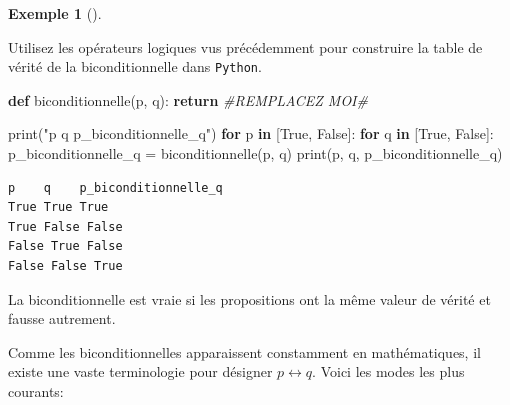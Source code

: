 \documentclass[
  letterpaper,
]{scrbook}
\newenvironment{Shaded}{}{}
\newcommand{\BuiltInTok}[1]{#1}
\newcommand{\CommentTok}[1]{\textcolor[rgb]{0.38,0.63,0.69}{\textit{#1}}}
\newcommand{\ControlFlowTok}[1]{\textcolor[rgb]{0.00,0.44,0.13}{\textbf{#1}}}
\newcommand{\KeywordTok}[1]{\textcolor[rgb]{0.00,0.44,0.13}{\textbf{#1}}}
\newcommand{\NormalTok}[1]{#1}
\newcommand{\OperatorTok}[1]{\textcolor[rgb]{0.40,0.40,0.40}{#1}}
\newcommand{\StringTok}[1]{\textcolor[rgb]{0.25,0.44,0.63}{#1}}
\newcommand{\VariableTok}[1]{\textcolor[rgb]{0.10,0.09,0.49}{#1}}
\theoremstyle{plain}
\theoremstyle{definition}
\newtheorem{example}{Exemple}[chapter]
\theoremstyle{definition}
\theoremstyle{remark}
\begin{document}
\leavevmode{}%
\begin{example}[]\label{exm-biconditionnelle-python}

Utilisez les opérateurs logiques vus précédemment pour construire la
table de vérité de la biconditionnelle dans \texttt{Python}.

\hypertarget{biconditionnelle-python-todo}{}
\begin{Shaded}
\begin{Highlighting}[]
\KeywordTok{def}\NormalTok{ biconditionnelle(p, q):}
    \ControlFlowTok{return} \CommentTok{\#REMPLACEZ MOI\#}

\BuiltInTok{print}\NormalTok{(}\StringTok{"p    q    p\_biconditionnelle\_q"}\NormalTok{)}
\ControlFlowTok{for}\NormalTok{ p }\KeywordTok{in}\NormalTok{ [}\VariableTok{True}\NormalTok{, }\VariableTok{False}\NormalTok{]:}
    \ControlFlowTok{for}\NormalTok{ q }\KeywordTok{in}\NormalTok{ [}\VariableTok{True}\NormalTok{, }\VariableTok{False}\NormalTok{]:}
\NormalTok{        p\_biconditionnelle\_q }\OperatorTok{=}\NormalTok{ biconditionnelle(p, q)}
        \BuiltInTok{print}\NormalTok{(p, q, p\_biconditionnelle\_q)}
\end{Highlighting}
\end{Shaded}

\hypertarget{biconditionnelle-python}{}
\begin{verbatim}
p    q    p_biconditionnelle_q
True True True
True False False
False True False
False False True
\end{verbatim}

\end{example}

\begin{tcolorbox}[enhanced jigsaw, opacityback=0, rightrule=.15mm, breakable, toprule=.15mm, colbacktitle=quarto-callout-important-color!10!white, title=\textcolor{quarto-callout-important-color}{\faExclamation}\hspace{0.5em}{Important}, titlerule=0mm, arc=.35mm, colback=white, coltitle=black, colframe=quarto-callout-important-color-frame, bottomtitle=1mm, toptitle=1mm, bottomrule=.15mm, leftrule=.75mm, left=2mm, opacitybacktitle=0.6]

La biconditionnelle est vraie si les propositions ont la même valeur de
vérité et fausse autrement.

\end{tcolorbox}

Comme les biconditionnelles apparaissent constamment en mathématiques,
il existe une vaste terminologie pour désigner \(p\leftrightarrow q\).
Voici les modes les plus courants:
\end{document}
